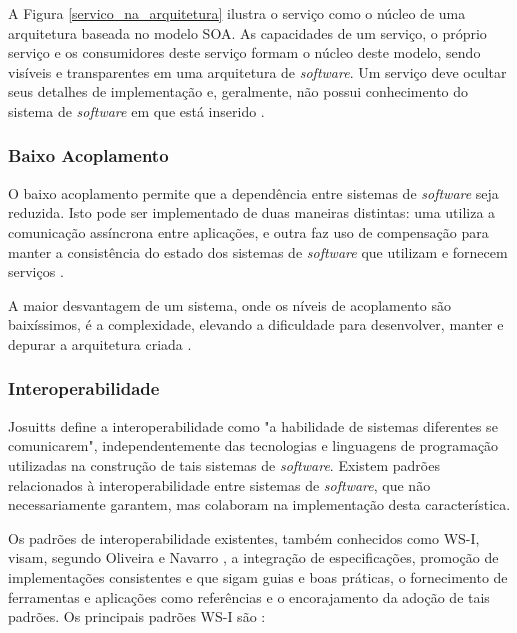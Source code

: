 A Figura \ref{servico_na_arquitetura} ilustra o serviço como o núcleo de uma arquitetura baseada no modelo SOA. As capacidades de um serviço, o próprio serviço e os consumidores deste serviço formam o núcleo deste modelo, sendo visíveis e transparentes em uma arquitetura de \textit{software}. Um serviço deve ocultar seus detalhes de implementação e, geralmente, não possui conhecimento do sistema de \textit{software} em que está inserido \cite{nickull_service_2007}.

\subsubsection{Baixo Acoplamento}
O baixo acoplamento permite que a dependência entre sistemas de \textit{software} seja reduzida. Isto pode ser implementado de duas maneiras distintas: uma utiliza a comunicação assíncrona entre aplicações, e outra faz uso de compensação para manter a consistência do estado dos sistemas de \textit{software} que utilizam e fornecem serviços \cite{josuttis_soa_2007}.

A maior desvantagem de um sistema, onde os níveis de acoplamento são baixíssimos, é a complexidade, elevando a dificuldade para desenvolver, manter e depurar a arquitetura criada \cite{josuttis_soa_2007}.

\subsubsection{Interoperabilidade}
Josuitts \cite{josuttis_soa_2007} define a interoperabilidade como "a habilidade de sistemas diferentes se comunicarem", independentemente das tecnologias e linguagens de programação utilizadas na construção de tais sistemas de \textit{software}. Existem padrões relacionados à interoperabilidade entre sistemas de \textit{software}, que não necessariamente garantem, mas colaboram na implementação desta característica. 

Os padrões de interoperabilidade existentes, também conhecidos como WS-I, visam, segundo Oliveira e Navarro \cite{oliveira_interoperabilidade}, a integração de especificações, promoção de implementações consistentes e que sigam guias e boas práticas, o fornecimento de ferramentas e aplicações como referências e o encorajamento da adoção de tais padrões. Os principais padrões WS-I são \cite{oliveira_interoperabilidade}:

